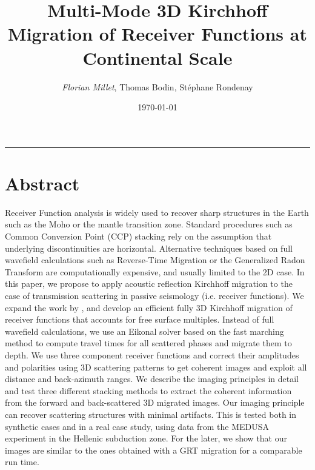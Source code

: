 \documentclass[9pt,a4paper]{article}
\title{Multi-Mode 3D Kirchhoff Migration of Receiver Functions at Continental Scale}
\author{\textit{Florian Millet}, Thomas Bodin, Stéphane Rondenay}
\date{\today}
\renewcommand{\thepage}{}
\numberwithin{equation}{section}
\begin{document}

\renewcommand{\thepage}{\arabic{page}}
\setcounter{page}{1}

\maketitle

\begin{center}\rule{4cm}{.55pt}\end{center}
\vspace{-2mm}

\section*{Abstract}

Receiver Function analysis is widely used to recover sharp structures in the Earth such as the Moho or the mantle transition zone. 
Standard procedures such as Common Conversion Point (CCP) stacking rely on the assumption that underlying discontinuities are horizontal. 
Alternative techniques based on full wavefield calculations such as Reverse-Time Migration or the Generalized Radon Transform are computationally expensive, and usually limited to the 2D case. 
In this paper, we propose to apply acoustic reflection Kirchhoff migration to the case of transmission scattering in passive seismology (i.e. receiver functions).
We expand the work by \cite{cheng_gji_16}, and develop an efficient fully 3D Kirchhoff migration of receiver functions that accounts for free surface multiples. 
Instead of full wavefield calculations, we use an Eikonal solver based on the fast marching method to compute travel times for all scattered phases and migrate them to depth. 
We use three component receiver functions and correct their amplitudes and polarities using 3D scattering patterns to get coherent images and exploit all distance and back-azimuth ranges. 
We describe the imaging principles in detail and test three different stacking methods to extract the coherent information from the forward and back-scattered 3D migrated images. 
Our imaging principle can recover scattering structures with minimal artifacts. 
This is tested both in synthetic cases and in a real case study, using data from the MEDUSA experiment in the Hellenic subduction zone. 
For the later, we show that our images are similar to the ones obtained with a GRT migration for a comparable run time.
\end{document}
